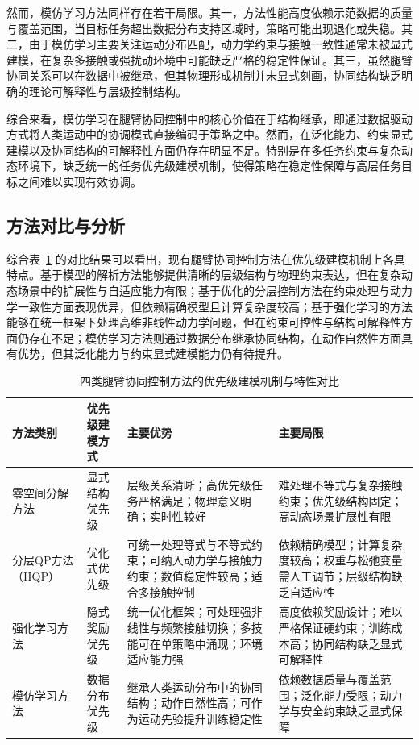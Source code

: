 然而，模仿学习方法同样存在若干局限。其一，方法性能高度依赖示范数据的质量与覆盖范围，当目标任务超出数据分布支持区域时，策略可能出现退化或失稳。其二，由于模仿学习主要关注运动分布匹配，动力学约束与接触一致性通常未被显式建模，在复杂多接触或强扰动环境中可能缺乏严格的稳定性保证。其三，虽然腿臂协同关系可以在数据中被继承，但其物理形成机制并未显式刻画，协同结构缺乏明确的理论可解释性与层级控制结构。

综合来看，模仿学习在腿臂协同控制中的核心价值在于结构继承，即通过数据驱动方式将人类运动中的协调模式直接编码于策略之中。然而，在泛化能力、约束显式建模以及协同结构的可解释性方面仍存在明显不足。特别是在多任务约束与复杂动态环境下，缺乏统一的任务优先级建模机制，使得策略在稳定性保障与高层任务目标之间难以实现有效协调。


\subsection{方法对比与分析}
综合表~\ref{tab:priority_mechanism_compare} 的对比结果可以看出，现有腿臂协同控制方法在优先级建模机制上各具特点。基于模型的解析方法能够提供清晰的层级结构与物理约束表达，但在复杂动态场景中的扩展性与自适应能力有限；基于优化的分层控制方法在约束处理与动力学一致性方面表现优异，但依赖精确模型且计算复杂度较高；基于强化学习的方法能够在统一框架下处理高维非线性动力学问题，但在约束可控性与结构可解释性方面仍存在不足；模仿学习方法则通过数据分布继承协同结构，在动作自然性方面具有优势，但其泛化能力与约束显式建模能力仍有待提升。

\begin{table}[htbp]
	\centering
	\caption{四类腿臂协同控制方法的优先级建模机制与特性对比}
	\label{tab:priority_mechanism_compare}
	\renewcommand{\arraystretch}{1.35}
	\begin{tabular}{p{3cm} p{3cm} p{4.5cm} p{4.5cm}}
		\toprule
		\textbf{方法类别} & \textbf{优先级建模方式} & \textbf{主要优势} & \textbf{主要局限} \\
		\midrule
		
		零空间分解方法 &
		显式结构优先级 &
		层级关系清晰；高优先级任务严格满足；物理意义明确；实时性较好 &
		难处理不等式与复杂接触约束；优先级结构固定；高动态场景扩展性有限 \\
		
		分层QP方法（HQP） &
		优化式优先级 &
		可统一处理等式与不等式约束；可纳入动力学与接触力约束；数值稳定性较高；适合多接触控制 &
		依赖精确模型；计算复杂度较高；权重与松弛变量需人工调节；层级结构缺乏自适应性 \\
		
		强化学习方法 &
		隐式奖励优先级 &
		统一优化框架；可处理强非线性与频繁接触切换；多技能可在单策略中涌现；环境适应能力强 &
		高度依赖奖励设计；难以严格保证硬约束；训练成本高；协同结构缺乏显式可解释性 \\
		
		模仿学习方法 &
		数据分布优先级 &
		继承人类运动分布中的协同结构；动作自然性高；可作为运动先验提升训练稳定性 &
		依赖数据质量与覆盖范围；泛化能力受限；动力学与安全约束缺乏显式保障 \\
		
		\bottomrule
	\end{tabular}
\end{table}

